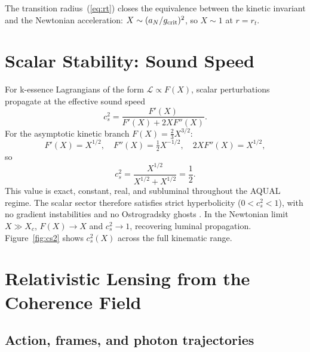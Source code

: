 \documentclass[11pt,a4paper]{article}
\begin{document}
The transition radius~(\ref{eq:rt}) closes the equivalence between the kinetic invariant
and the Newtonian acceleration: $X\sim (a_N/g_{\rm crit})^2$, so $X\sim 1$ at $r = r_t$.

\section{Scalar Stability: Sound Speed}
\label{sec:stability}

For k-essence Lagrangians of the form $\mathcal{L}\propto F(X)$, scalar perturbations
propagate at the effective sound speed \cite{ArmendarizPicon1999}
\begin{equation}
  c_s^2 = \frac{F'(X)}{F'(X) + 2X F''(X)}.
  \label{eq:cs2}
\end{equation}
For the asymptotic kinetic branch $F(X) = \tfrac{2}{3}X^{3/2}$:
\begin{equation}
  F'(X) = X^{1/2}, \quad F''(X) = \tfrac{1}{2}X^{-1/2},
  \quad 2X F''(X) = X^{1/2},
\end{equation}
so
\begin{equation}
  \boxed{c_s^2 = \frac{X^{1/2}}{X^{1/2} + X^{1/2}} = \frac{1}{2}.}
  \label{eq:cs2_half}
\end{equation}
This value is exact, constant, real, and subluminal throughout the AQUAL regime.
The scalar sector therefore satisfies strict hyperbolicity ($0 < c_s^2 < 1$), with
no gradient instabilities and no Ostrogradsky ghosts \cite{Woodard2007}.
In the Newtonian limit $X\gg X_c$, $F(X)\to X$ and $c_s^2\to 1$, recovering
luminal propagation. Figure~\ref{fig:cs2} shows $c_s^2(X)$ across the full kinematic
range.

\section{Relativistic Lensing from the Coherence Field}
\label{sec:lensing}

\subsection{Action, frames, and photon trajectories}
\label{subsec:lensing_action}
\end{document}
